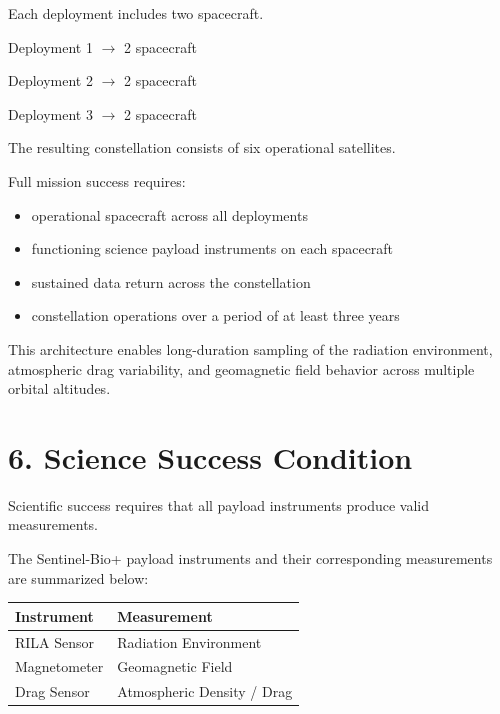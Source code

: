 \documentclass[11pt]{article}
\begin{document}
Each deployment includes two spacecraft.

\begin{center}

Deployment 1 $\rightarrow$ 2 spacecraft

Deployment 2 $\rightarrow$ 2 spacecraft

Deployment 3 $\rightarrow$ 2 spacecraft

\end{center}

The resulting constellation consists of six operational satellites.

Full mission success requires:

\begin{itemize}

\item operational spacecraft across all deployments

\item functioning science payload instruments on each spacecraft

\item sustained data return across the constellation

\item constellation operations over a period of at least three years

\end{itemize}

This architecture enables long-duration sampling of the radiation environment, atmospheric drag variability, and geomagnetic field behavior across multiple orbital altitudes.

\section*{6. Science Success Condition}

Scientific success requires that all payload instruments produce valid measurements.

The Sentinel-Bio+ payload instruments and their corresponding measurements are summarized below:

\begin{center}

\begin{tabular}{ll}

Instrument & Measurement \\

\hline

RILA Sensor & Radiation Environment \\

Magnetometer & Geomagnetic Field \\

Drag Sensor & Atmospheric Density / Drag \\

\end{tabular}

\end{center}
\end{document}
